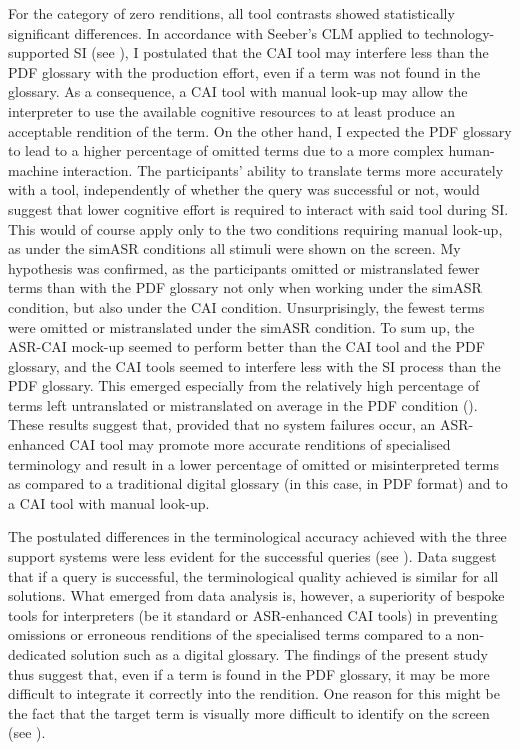 For the category of zero renditions, all tool contrasts showed statistically significant differences. In accordance with Seeber's CLM applied to technology-supported SI (see ), I postulated that the CAI tool may interfere less than the PDF glossary with the production effort, even if a term was not found in the glossary. As a consequence, a CAI tool with manual look-up may allow the interpreter to use the available cognitive resources to at least produce an acceptable rendition of the term. On the other hand, I expected the PDF glossary to lead to a higher percentage of omitted terms due to a more complex human-machine interaction. The participants' ability to translate terms more accurately with a tool, independently of whether the query was successful or not, would suggest that lower cognitive effort is required to interact with said tool during SI. This would of course apply only to the two conditions requiring manual look-up, as under the simASR conditions all stimuli were shown on the screen. My hypothesis was confirmed, as the participants omitted or mistranslated fewer terms than with the PDF glossary not only when working under the simASR condition, but also under the CAI condition. Unsurprisingly, the fewest terms were omitted or mistranslated under the simASR condition. To sum up, the ASR-CAI mock-up seemed to perform better than the CAI tool and the PDF glossary, and the CAI tools seemed to interfere less with the SI process than the PDF glossary. This emerged especially from the relatively high percentage of terms left untranslated or mistranslated on average in the PDF condition (). These results suggest that, provided that no system failures occur, an ASR-enhanced CAI tool may promote more accurate renditions of specialised terminology and result in a lower percentage of omitted or misinterpreted terms as compared to a traditional digital glossary (in this case, in PDF format) and to a CAI tool with manual look-up.

The postulated differences in the terminological accuracy achieved with the three support systems were less evident for the successful queries (see ). Data suggest that if a query is successful, the terminological quality achieved is similar for all solutions. What emerged from data analysis is, however, a superiority of bespoke tools for interpreters (be it standard or ASR-enhanced CAI tools) in preventing omissions or erroneous renditions of the specialised terms compared to a non-dedicated solution such as a digital glossary. The findings of the present study thus suggest that, even if a term is found in the PDF glossary, it may be more difficult to integrate it correctly into the rendition. One reason for this might be the fact that the target term is visually more difficult to identify on the screen (see ).

